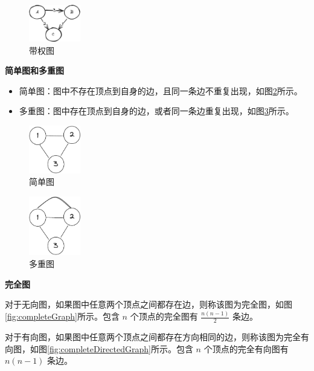 \documentclass[lang=cn,newtx,10pt,scheme=chinese]{../elegantbook}
\begin{document}
    \begin{figure}[!htbp]
      \centering
      \includegraphics[width=0.2\textwidth]{./figure/pdf/cropped/weightedGraph.pdf}
      \caption{带权图}
      \label{fig:weightedGraph}
    \end{figure}

\textbf{简单图和多重图}

\begin{itemize}
  \item 简单图：图中不存在顶点到自身的边，且同一条边不重复出现，如图\ref{fig:simpleGraph}所示。
  \item 多重图：图中存在顶点到自身的边，或者同一条边重复出现，如图\ref{fig:multipleGraph}所示。
  \end{itemize}

  \begin{figure}[!htbp]
    \centering
    \includegraphics[width=0.2\textwidth]{./figure/pdf/cropped/unDirection.pdf}
    \caption{简单图}
    \label{fig:simpleGraph}
  \end{figure}

  \begin{figure}[!htbp]
    \centering
    \includegraphics[width=0.2\textwidth]{./figure/pdf/cropped/mutipleGraph.pdf}
    \caption{多重图}
    \label{fig:multipleGraph}
  \end{figure}

\textbf{完全图}

对于无向图，如果图中任意两个顶点之间都存在边，则称该图为完全图，如图\ref{fig:completeGraph}所示。包含 $n$ 个顶点的完全图有 $\frac{n(n-1)}{2}$ 条边。

对于有向图，如果图中任意两个顶点之间都存在方向相同的边，则称该图为完全有向图，如图\ref{fig:completeDirectedGraph}所示。包含 $n$ 个顶点的完全有向图有 $n(n-1)$ 条边。
\end{document}
